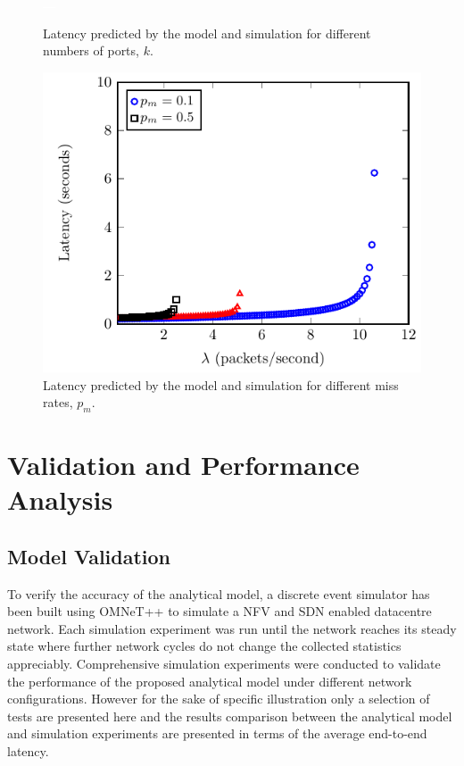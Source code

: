 \begin{figure}
	\vspace{2mm}

	\centering
	\begin{minipage}[b]{.49\textwidth}
		\includegraphics[width=\linewidth]{graphs/num_ports}
		\caption{Latency predicted by the model and simulation for different numbers
			of ports, $k$.}
		\label{fig:num_ports}
	\end{minipage}
	\hfill
	\begin{minipage}[b]{.49\textwidth}
		\includegraphics[width=\linewidth]{graphs/diff_sdn}
		\caption{Latency predicted by the model and simulation for different miss rates, $p_{m}$.}
		\label{fig:sdn_perc}
	\end{minipage}

\end{figure}

\section{Validation and Performance Analysis}
\label{sec:validation}

\subsection{Model Validation}

To verify the accuracy of the analytical model, a discrete event simulator has been built using OMNeT++ \cite{VargaH08} to simulate a NFV and SDN enabled datacentre network. Each simulation experiment was run until the network reaches its steady state where further network cycles do not change the collected statistics appreciably. Comprehensive simulation experiments were conducted to validate the performance of the proposed analytical model under different network configurations. However for the sake of specific illustration only a selection of tests are presented here and the results comparison between the analytical model and simulation experiments are presented in terms of the average end-to-end latency.

